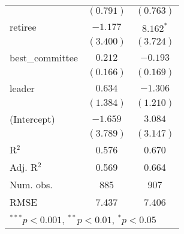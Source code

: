 \documentclass[12pt]{article}
\begin{document}
\begin{table}
\begin{center}
\begin{tabular}{l c c }
			& $(0.791)$      & $(0.763)$      \\
			retiree                  & $-1.177$       & $8.162^{*}$    \\
			& $(3.400)$      & $(3.724)$      \\
			best\_committee          & $0.212$        & $-0.193$       \\
			& $(0.166)$      & $(0.169)$      \\
			leader                   & $0.634$        & $-1.306$       \\
			& $(1.384)$      & $(1.210)$      \\
			(Intercept)              & $-1.659$       & $3.084$        \\
			& $(3.789)$      & $(3.147)$      \\
			\hline
			R$^2$                    & 0.576          & 0.670          \\
			Adj. R$^2$               & 0.569          & 0.664          \\
			Num. obs.                & 885            & 907            \\
			RMSE                     & 7.437          & 7.406          \\
			\hline
			\multicolumn{3}{l}{\scriptsize{$^{***}p<0.001$, $^{**}p<0.01$, $^*p<0.05$}}
		\end{tabular}
	\end{center}
\end{table}
\end{document}
